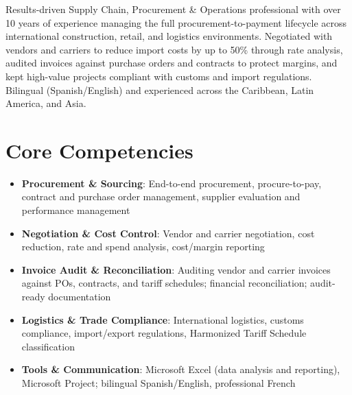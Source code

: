 \documentclass[11pt,a4paper,sans]{moderncv}
\begin{document}
\makecvtitle


\vspace{6pt}
\small{Results-driven Supply Chain, Procurement \& Operations professional with over 10 years of experience managing the full procurement-to-payment lifecycle across international construction, retail, and logistics environments. Negotiated with vendors and carriers to reduce import costs by up to 50\% through rate analysis, audited invoices against purchase orders and contracts to protect margins, and kept high-value projects compliant with customs and import regulations. Bilingual (Spanish/English) and experienced across the Caribbean, Latin America, and Asia.}


\section{Core Competencies}
\vspace{1pt}
\begin{itemize}

\item \textbf{Procurement \& Sourcing}: End-to-end procurement, procure-to-pay, contract and purchase order management, supplier evaluation and performance management

\item \textbf{Negotiation \& Cost Control}: Vendor and carrier negotiation, cost reduction, rate and spend analysis, cost/margin reporting

\item \textbf{Invoice Audit \& Reconciliation}: Auditing vendor and carrier invoices against POs, contracts, and tariff schedules; financial reconciliation; audit-ready documentation

\item \textbf{Logistics \& Trade Compliance}: International logistics, customs compliance, import/export regulations, Harmonized Tariff Schedule classification

\item \textbf{Tools \& Communication}: Microsoft Excel (data analysis and reporting), Microsoft Project; bilingual Spanish/English, professional French

\end{itemize}
\end{document}
